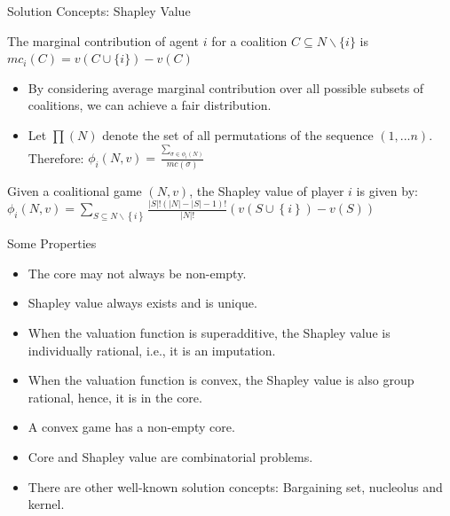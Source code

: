 \documentclass{beamer}
\begin{document}
%
\begin{frame}{Solution Concepts: Shapley Value}
    \begin{definition} \label{dfn:marginalcontribution}
        The {\color{blue}marginal contribution} of agent $i$ for a coalition $C \subseteq N \backslash \{i\}$ is $mc_i(C) = v(C \cup \{i\}) - v(C)$
    \end{definition}

    \begin{itemize}
        \item By considering average marginal contribution over all possible subsets of coalitions, we can achieve a fair distribution.\\
        \item Let $\prod(N)$ denote the set of all permutations of the sequence $(1,...n)$. Therefore: $\phi_i(N,v) = \frac{\sum_{\sigma \in \phi_i(N)}}{mc(\sigma)}$
    \end{itemize}

    \begin{definition} \label{dfn:shapleyvalue}
        Given a coalitional game $(N,v)$, the Shapley value of player $i$ is given by: \\
        $\phi_i(N,v) = \sum_{S \subseteq N \backslash \left\{i\right\} } \frac{|S|! (|N|-|S|-1)!}{|N|!} (v(S \cup \left\{i\right\}) - v(S))$
    \end{definition}
\end{frame}
\begin{frame}{Some Properties}
    \begin{itemize}
        \item The core may not always be non-empty.
        \item Shapley value always exists and is unique.
        \item When the valuation function is {\color{blue}superadditive}, the Shapley value is {\color{blue}individually rational}, i.e., it is an imputation.
        \item When the valuation function is {\color{blue}convex}, the Shapley value is also group rational, hence, it is in the {\color{blue}core}.
        \item A convex game has a non-empty core.
        \item Core and Shapley value are combinatorial problems.
        \item There are other well-known solution concepts: Bargaining set, nucleolus and kernel.
    \end{itemize}
\end{frame}
\end{document}

